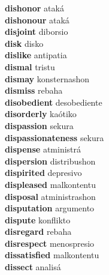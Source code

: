 \textbf{dishonor } ataká \\
\textbf{dishonour } ataká \\
\textbf{disjoint } diborsio \\
\textbf{disk } disko \\
\textbf{dislike } antipatia \\
\textbf{dismal } tristu \\
\textbf{dismay } konsternashon \\
\textbf{dismiss } rebaha \\
\textbf{disobedient } desobediente \\
\textbf{disorderly } kaótiko \\
\textbf{dispassion } sekura \\
\textbf{dispassionateness } sekura \\
\textbf{dispense } atministrá \\
\textbf{dispersion } distribushon \\
\textbf{dispirited } depresivo \\
\textbf{displeased } malkontentu \\
\textbf{disposal } atministrashon \\
\textbf{disputation } argumento \\
\textbf{dispute } konflikto \\
\textbf{disregard } rebaha \\
\textbf{disrespect } menospresio \\
\textbf{dissatisfied } malkontentu \\
\textbf{dissect } analisá \\
